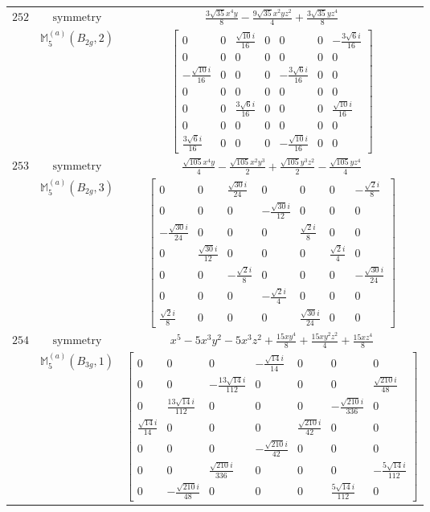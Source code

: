 \documentclass[fleqn,8pt,landscape]{jsarticle}
\begin{document}
\begin{longtable}{ccc}
$ 252 $ & $ \text{symmetry} $ & $ \frac{3 \sqrt{35} x^{4} y}{8} - \frac{9 \sqrt{35} x^{2} y z^{2}}{4} + \frac{3 \sqrt{35} y z^{4}}{8} $ \\
$  $ & $ \mathbb{M}_{5}^{(a)}(B_{2g},2) $ & $ \begin{bmatrix} 0 & 0 & \frac{\sqrt{10} i}{16} & 0 & 0 & 0 & - \frac{3 \sqrt{6} i}{16} \\ 0 & 0 & 0 & 0 & 0 & 0 & 0 \\ - \frac{\sqrt{10} i}{16} & 0 & 0 & 0 & - \frac{3 \sqrt{6} i}{16} & 0 & 0 \\ 0 & 0 & 0 & 0 & 0 & 0 & 0 \\ 0 & 0 & \frac{3 \sqrt{6} i}{16} & 0 & 0 & 0 & \frac{\sqrt{10} i}{16} \\ 0 & 0 & 0 & 0 & 0 & 0 & 0 \\ \frac{3 \sqrt{6} i}{16} & 0 & 0 & 0 & - \frac{\sqrt{10} i}{16} & 0 & 0 \end{bmatrix} $ \\ \hline
$ 253 $ & $ \text{symmetry} $ & $ \frac{\sqrt{105} x^{4} y}{4} - \frac{\sqrt{105} x^{2} y^{3}}{2} + \frac{\sqrt{105} y^{3} z^{2}}{2} - \frac{\sqrt{105} y z^{4}}{4} $ \\
$  $ & $ \mathbb{M}_{5}^{(a)}(B_{2g},3) $ & $ \begin{bmatrix} 0 & 0 & \frac{\sqrt{30} i}{24} & 0 & 0 & 0 & - \frac{\sqrt{2} i}{8} \\ 0 & 0 & 0 & - \frac{\sqrt{30} i}{12} & 0 & 0 & 0 \\ - \frac{\sqrt{30} i}{24} & 0 & 0 & 0 & \frac{\sqrt{2} i}{8} & 0 & 0 \\ 0 & \frac{\sqrt{30} i}{12} & 0 & 0 & 0 & \frac{\sqrt{2} i}{4} & 0 \\ 0 & 0 & - \frac{\sqrt{2} i}{8} & 0 & 0 & 0 & - \frac{\sqrt{30} i}{24} \\ 0 & 0 & 0 & - \frac{\sqrt{2} i}{4} & 0 & 0 & 0 \\ \frac{\sqrt{2} i}{8} & 0 & 0 & 0 & \frac{\sqrt{30} i}{24} & 0 & 0 \end{bmatrix} $ \\ \hline
$ 254 $ & $ \text{symmetry} $ & $ x^{5} - 5 x^{3} y^{2} - 5 x^{3} z^{2} + \frac{15 x y^{4}}{8} + \frac{15 x y^{2} z^{2}}{4} + \frac{15 x z^{4}}{8} $ \\
$  $ & $ \mathbb{M}_{5}^{(a)}(B_{3g},1) $ & $ \begin{bmatrix} 0 & 0 & 0 & - \frac{\sqrt{14} i}{14} & 0 & 0 & 0 \\ 0 & 0 & - \frac{13 \sqrt{14} i}{112} & 0 & 0 & 0 & \frac{\sqrt{210} i}{48} \\ 0 & \frac{13 \sqrt{14} i}{112} & 0 & 0 & 0 & - \frac{\sqrt{210} i}{336} & 0 \\ \frac{\sqrt{14} i}{14} & 0 & 0 & 0 & \frac{\sqrt{210} i}{42} & 0 & 0 \\ 0 & 0 & 0 & - \frac{\sqrt{210} i}{42} & 0 & 0 & 0 \\ 0 & 0 & \frac{\sqrt{210} i}{336} & 0 & 0 & 0 & - \frac{5 \sqrt{14} i}{112} \\ 0 & - \frac{\sqrt{210} i}{48} & 0 & 0 & 0 & \frac{5 \sqrt{14} i}{112} & 0 \end{bmatrix} $ \\ \hline

\end{longtable}
\end{document}
